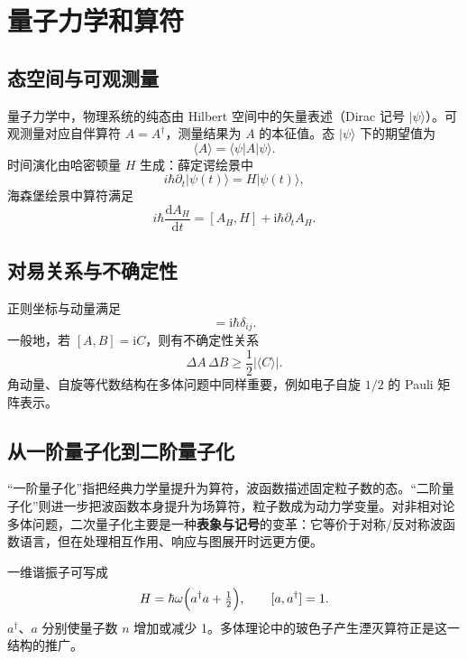 \section{量子力学和算符}

\subsection{态空间与可观测量}

量子力学中，物理系统的纯态由 Hilbert 空间中的矢量表述（Dirac 记号 $|\psi\rangle$）。可观测量对应自伴算符 $A=A^\dagger$，测量结果为 $A$ 的本征值。态 $|\psi\rangle$ 下的期望值为
\begin{equation}
  \langle A\rangle=\langle\psi|A|\psi\rangle.
\end{equation}
时间演化由哈密顿量 $H$ 生成：薛定谔绘景中
\begin{equation}
  i\hbar\partial_t|\psi(t)\rangle=H|\psi(t)\rangle,
\end{equation}
海森堡绘景中算符满足
\begin{equation}
  i\hbar\frac{\mathrm{d}A_H}{\mathrm{d}t}=[A_H,H]+\mathrm{i}\hbar\partial_t A_H.
\end{equation}

\subsection{对易关系与不确定性}

正则坐标与动量满足
\begin{equation}
  [x_i,p_j]=\mathrm{i}\hbar\delta_{ij}.
\end{equation}
一般地，若 $[A,B]=\mathrm{i}C$，则有不确定性关系
\begin{equation}
  \Delta A\,\Delta B\ge\frac12|\langle C\rangle|.
\end{equation}
角动量、自旋等代数结构在多体问题中同样重要，例如电子自旋 $1/2$ 的 Pauli 矩阵表示。

\subsection{从一阶量子化到二阶量子化}

“一阶量子化”指把经典力学量提升为算符，波函数描述固定粒子数的态。“二阶量子化”则进一步把波函数本身提升为场算符，粒子数成为动力学变量。对非相对论多体问题，二次量子化主要是一种\textbf{表象与记号}的变革：它等价于对称/反对称波函数语言，但在处理相互作用、响应与图展开时远更方便。

\begin{example}
一维谐振子可写成
\begin{equation}
  H=\hbar\omega\Bigl(a^\dagger a+\tfrac12\Bigr),
  \qquad
  [a,a^\dagger]=1.
\end{equation}
$a^\dagger$、$a$ 分别使量子数 $n$ 增加或减少 1。多体理论中的玻色子产生湮灭算符正是这一结构的推广。
\end{example}
